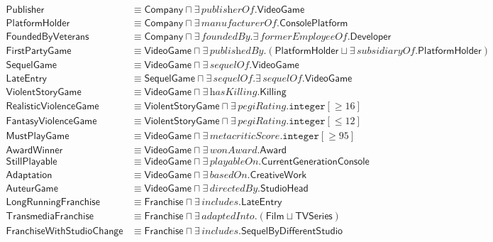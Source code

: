 \begin{align*}
\textsf{Publisher} &\equiv \textsf{Company} \sqcap \exists\,\textit{publisherOf}.\textsf{VideoGame} \\
\textsf{PlatformHolder} &\equiv \textsf{Company} \sqcap \exists\,\textit{manufacturerOf}.\textsf{ConsolePlatform} \\
\textsf{FoundedByVeterans} &\equiv \textsf{Company} \sqcap \exists\,\textit{foundedBy}.\exists\,\textit{formerEmployeeOf}.\textsf{Developer} \\
\textsf{FirstPartyGame} &\equiv \textsf{VideoGame} \sqcap \exists\,\textit{publishedBy}.(\textsf{PlatformHolder} \sqcup \exists\,\textit{subsidiaryOf}.\textsf{PlatformHolder}) \\
\textsf{SequelGame} &\equiv \textsf{VideoGame} \sqcap \exists\,\textit{sequelOf}.\textsf{VideoGame} \\
\textsf{LateEntry} &\equiv \textsf{SequelGame} \sqcap \exists\,\textit{sequelOf}.\exists\,\textit{sequelOf}.\textsf{VideoGame} \\
\textsf{ViolentStoryGame} &\equiv \textsf{VideoGame} \sqcap \exists\,\textit{hasKilling}.\textsf{Killing} \\
\textsf{RealisticViolenceGame} &\equiv \textsf{ViolentStoryGame} \sqcap \exists\,\textit{pegiRating}.\texttt{integer}[\geq 16] \\
\textsf{FantasyViolenceGame} &\equiv \textsf{ViolentStoryGame} \sqcap \exists\,\textit{pegiRating}.\texttt{integer}[\leq 12] \\
\textsf{MustPlayGame} &\equiv \textsf{VideoGame} \sqcap \exists\,\textit{metacriticScore}.\texttt{integer}[\geq 95] \\
\textsf{AwardWinner} &\equiv \textsf{VideoGame} \sqcap \exists\,\textit{wonAward}.\textsf{Award} \\
\textsf{StillPlayable} &\equiv \textsf{VideoGame} \sqcap \exists\,\textit{playableOn}.\textsf{CurrentGenerationConsole} \\
\textsf{Adaptation} &\equiv \textsf{VideoGame} \sqcap \exists\,\textit{basedOn}.\textsf{CreativeWork} \\
\textsf{AuteurGame} &\equiv \textsf{VideoGame} \sqcap \exists\,\textit{directedBy}.\textsf{StudioHead} \\
\textsf{LongRunningFranchise} &\equiv \textsf{Franchise} \sqcap \exists\,\textit{includes}.\textsf{LateEntry} \\
\textsf{TransmediaFranchise} &\equiv \textsf{Franchise} \sqcap \exists\,\textit{adaptedInto}.(\textsf{Film} \sqcup \textsf{TVSeries}) \\
\textsf{FranchiseWithStudioChange} &\equiv \textsf{Franchise} \sqcap \exists\,\textit{includes}.\textsf{SequelByDifferentStudio} \\

\end{align*}
